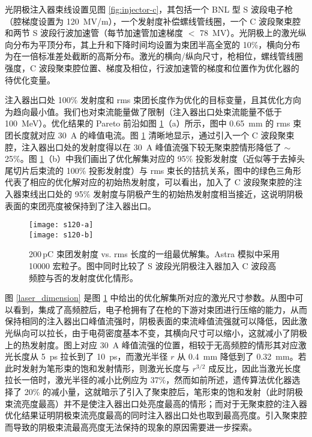 光阴极注入器束线设置见图 \ref{fig:injector-c}，其包括一个 BNL 型 S 波段电子枪（腔梯度设置为 \SI{120}{MV/m}），一个发射度补偿螺线管线圈，一个 C 波段聚束腔和两节 S 波段行波加速管（每节加速管加速梯度 $<$ \SI{78}{MV}）。光阴极上的激光纵向分布为平顶分布，其上升和下降时间均设置为束团半高全宽的 10\%，横向分布为在一倍标准差处截断的高斯分布。激光的横向/纵向尺寸，枪相位，螺线管线圈强度，C 波段聚束腔位置、梯度及相位，行波加速管的梯度和位置作为优化器的待优化变量。

注入器出口处 100\% 发射度和 rms 束团长度作为优化的目标变量，且其优化方向为趋向最小值。我们也对束流能量做了限制（注入器出口处束流能量不低于 \SI{100}{MeV}）。优化结果的 Pareto 前沿如图 \ref{Pareto120}（a）所示，图中 \SI{0.65}{mm} 的 rms 束团长度就对应 \SI{30}{A} 的峰值电流。图 \ref{Pareto120} 清晰地显示，通过引入一个 C 波段聚束腔，注入器出口处的发射度得以在 \SI{30}{A} 峰值流强下较无聚束腔情形降低了 $\sim$25\%。图 \ref{Pareto120}（b）中我们画出了优化解集对应的 95\% 投影发射度（近似等于去掉头尾切片后束流的 100\% 投影发射度）与 rms 束长的拮抗关系，图中的绿色三角形代表了相应的优化解对应的初始热发射度，可以看出，加入了 C 波段聚束腔的注入器束线出口处的 95\% 发射度与阴极产生的初始热发射度相当接近，这说明阴极表面的束团亮度被保持到了注入器出口。

\begin{figure}[htbp]
	\centering
	\texttt{[image: s120-a]}\\
	\texttt{[image: s120-b]}
	\caption{
	200\,pC 束团发射度 vs. rms 长度的一组最优解集。Astra 模拟中采用 10000 宏粒子。图中同时比较了 S 波段光阴极注入器加入 C 波段高频腔与否的发射度优化情形。}
	\label{Pareto120}
\end{figure}

图 \ref{laser_dimension} 是图 \ref{Pareto120} 中给出的优化解集所对应的激光尺寸参数。从图中可以看到，集成了高频腔后，电子枪拥有了在枪的下游对束团进行压缩的能力，从而保持相同的注入器出口峰值流强时，阴极表面的束流峰值流强就可以降低，因此激光纵向可以拉长，由于电荷密度基本不变，其横向尺寸可以缩小，这就减小了阴极上的热发射度。图上对应 \SI{30}{A} 峰值流强的位置，相较于无高频腔的情形其对应激光长度从 \SI{5}{ps} 拉长到了 \SI{10}{ps}，而激光半径 $r$ 从 \SI{0.4}{mm} 降低到了 \SI{0.32}{mm}。若此时发射为笔形束的饱和发射情形，则激光长度与 $r^{3/2}$ 成反比，因此当激光长度拉长一倍时，激光半径的减小比例应为 37\%，然而如前所述，遗传算法优化器选择了 20\% 的减小量，这就暗示了引入了聚束腔后，笔形束的饱和发射（此时阴极束流亮度最高）并不是使注入器出口处亮度最高的情形；而对于无聚束腔的注入器优化结果证明阴极束流亮度最高的同时注入器出口处也取到最高亮度。引入聚束腔而导致的阴极束流最高亮度无法保持的现象的原因需要进一步探索。

